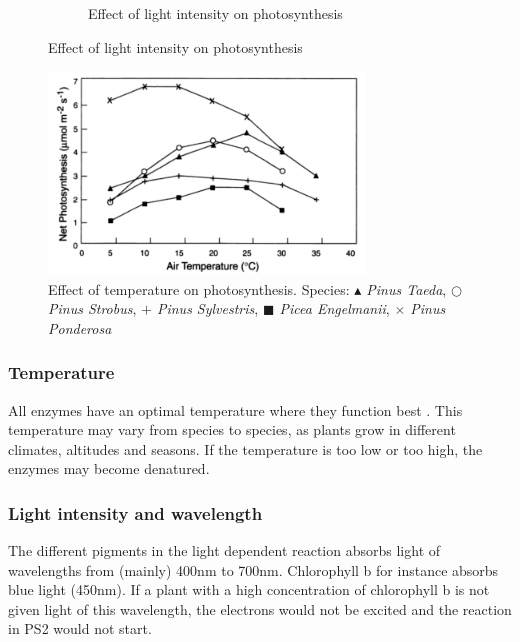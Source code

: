 \begin{figure}
\begin{subfigure}[b]{0.45\textwidth}
                \caption{Effect of light intensity on photosynthesis}
                \label{fig:lightintensity}
        \end{subfigure}
       
\end{figure}

\begin{figure}
\centering
\includegraphics[width=0.75\textwidth]{img/photosynthesis/temperature_new.png}
\caption{Effect of temperature on photosynthesis. Species:
 \textit{\ensuremath{\blacktriangle} Pinus Taeda},  
\textit{\ensuremath{\bigcirc} Pinus Strobus}, 
\textit{\ensuremath{+} Pinus Sylvestris}, 
\textit{\ensuremath{\blacksquare} Picea Engelmanii}, 
\textit{\ensuremath{\times} Pinus Ponderosa}
\citep{hollinger1995external}
}
\label{fig:temperature}
\end{figure}

\subsubsection{Temperature}
All enzymes have an optimal temperature where they function best \citep{bios}. This temperature may vary from species to species, as plants grow in different climates, altitudes and seasons. If the temperature is too low or too high, the enzymes may become denatured.  

\subsubsection{Light intensity and wavelength}
The different pigments in the light dependent reaction absorbs light of wavelengths from (mainly) 400nm to 700nm. Chlorophyll b for instance absorbs blue light (450nm). If a plant with a high concentration of chlorophyll b is not given light of this wavelength, the electrons would not be excited and the reaction in PS2 would not start.

